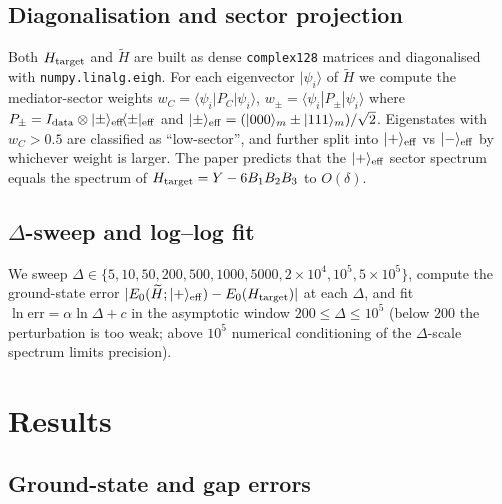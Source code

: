 \documentclass[11pt]{article}
\begin{document}
\subsection{Diagonalisation and sector projection}
Both $H_{\rm target}$ and $\widetilde H$ are built as dense
\texttt{complex128} matrices and diagonalised with
\texttt{numpy.linalg.eigh}.  For each eigenvector $|\psi_i\rangle$ of
$\widetilde H$ we compute the mediator-sector weights
$w_C = \langle\psi_i|P_C|\psi_i\rangle$,
$w_\pm = \langle\psi_i|P_{\pm}|\psi_i\rangle$ where
$P_\pm = I_{\rm data}\otimes|\pm\rangle_{\rm eff}\!\langle\pm|_{\rm eff}$
and $|\pm\rangle_{\rm eff}=(|000\rangle_m\pm|111\rangle_m)/\sqrt{2}$.
Eigenstates with $w_C > 0.5$ are classified as ``low-sector'', and
further split into $|+\rangle_{\rm eff}$ vs $|-\rangle_{\rm eff}$ by
whichever weight is larger.  The paper predicts that the
$|+\rangle_{\rm eff}$ sector spectrum equals the spectrum of
$H_{\rm target} = Y - 6 B_1 B_2 B_3$ to $O(\delta)$.

\subsection{$\Delta$-sweep and log--log fit}
We sweep $\Delta \in \{5, 10, 50, 200, 500, 1000, 5000, 2\!\times\!10^4,
10^5, 5\!\times\!10^5\}$, compute the ground-state error
$|E_0(\widetilde H;|+\rangle_{\rm eff}) - E_0(H_{\rm target})|$ at each
$\Delta$, and fit $\ln\text{err} = \alpha \ln\Delta + c$ in the
asymptotic window $200 \le \Delta \le 10^5$ (below $200$ the
perturbation is too weak; above $10^5$ numerical conditioning of the
$\Delta$-scale spectrum limits precision).

\section{Results}

\subsection{Ground-state and gap errors}
\end{document}
